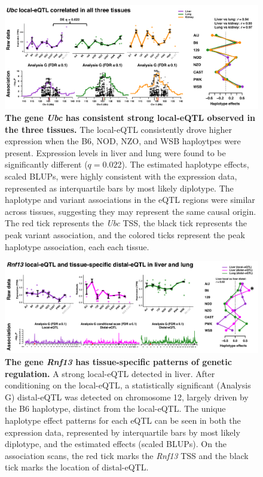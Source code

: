 \documentclass[10pt,letterpaper,twoside]{article}
\begin{document}
\begin{figure}[hp]
\renewcommand{\familydefault}{\sfdefault}\normalfont
\centering
\includegraphics[width=\textwidth, trim={0in 0in 0in 0in}, clip]{figs/ubc_correlated_eqtl.png}
\caption{\textbf{The gene \textit{Ubc} has consistent strong local-eQTL observed in the three tissues.} 
The local-eQTL consistently drove higher expression when the B6, NOD, NZO, and WSB haploytpes were present. Expression levels in liver and lung were found to be significantly different ($q = 0.022$). The estimated haplotype effects, scaled BLUPs, were highly consistent with the expression data, represented as interquartile bars by most likely diplotype. The haplotype and variant associations in the eQTL regions were similar across tissues, suggesting they may represent the same causal origin. The red tick represents the \textit{Ubc} TSS, the black tick represents the peak variant association, and the colored ticks represent the peak haplotype association, each each tissue.
\label{fig:ubc_correlated_eqtl}}
\end{figure}

\begin{figure}[hp]
\renewcommand{\familydefault}{\sfdefault}\normalfont
\centering
\includegraphics[width=\textwidth, trim={0in 0in 0in 0in}, clip]{figs/rnf13_distal_eqtl.png}
\caption{\textbf{The gene \textit{Rnf13} has tissue-specific patterns of genetic regulation.} 
A strong local-eQTL detected in liver. After conditioning on the local-eQTL, a statistically significant (Analysis G) distal-eQTL was detected on chromosome 12, largely driven by the B6 haplotype, distinct from the local-eQTL. The unique haplotype effect patterns for each eQTL can be seen in both the expression data, represented by interquartile bars by most likely diplotype, and the estimated effects (scaled BLUPs). On the association scans, the red tick marks the \textit{Rnf13} TSS and the black tick marks the location of distal-eQTL.
\label{fig:rnf13_distal_eqtl}}
\end{figure}
\end{document}
